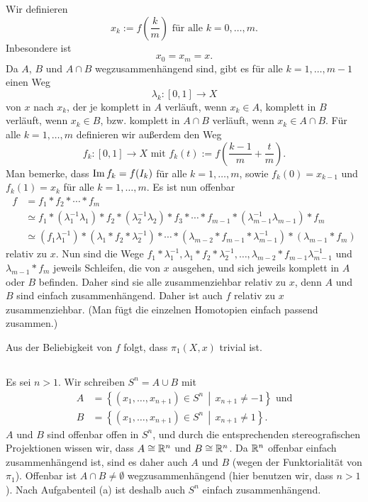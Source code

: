 \documentclass[a4paper,10pt]{article}
\begin{document}
Wir definieren
\[
 x_k := f\left( \frac{k}{m} \right) \text{ für alle } k = 0, \ldots, m.
\]
Inbesondere ist
\[
 x_0 = x_m = x.
\]
Da $A$, $B$ und $A \cap B$ wegzusammenhängend sind, gibt es für alle $k = 1, \ldots, m-1$ einen Weg
\[
 \lambda_k : [0,1] \to X
\]
von $x$ nach $x_k$, der je komplett in $A$ verläuft, wenn $x_k \in A$, komplett in $B$ verläuft, wenn $x_k \in B$, bzw. komplett in $A \cap B$ verläuft, wenn $x_k \in A \cap B$. Für alle $k = 1, \ldots, m$ definieren wir außerdem den Weg
\[
 f_k : [0,1] \to X \text{ mit } f_k(t) := f\left( \frac{k-1}{m} + \frac{t}{m} \right).
\]
Man bemerke, dass  $\operatorname{Im} f_k = f(I_k)$ für alle $k = 1, \ldots, m$, sowie $f_k(0) = x_{k-1}$ und$f_k(1) = x_k$ für alle $k = 1, \ldots, m$.
Es ist nun offenbar
\begin{align*}
 f
 &= f_1 * f_2 * \cdots * f_m \\
 &\simeq f_1 * \left( \lambda_1^{-1} \lambda_1 \right) * f_2 * \left( \lambda_2^{-1} \lambda_2 \right) * f_3 * \cdots * f_{m-1} * \left( \lambda_{m-1}^{-1} \lambda_{m-1} \right) * f_m \\
 &\simeq \left( f_1 \lambda_1^{-1} \right) * \left( \lambda_1 * f_2 * \lambda_2^{-1} \right) * \cdots * \left( \lambda_{m-2} * f_{m-1} * \lambda_{m-1}^{-1} \right) * \left( \lambda_{m-1} * f_m \right)
\end{align*}
relativ zu $x$. Nun sind die Wege  $f_1 * \lambda_1^{-1}, \lambda_1 * f_2 * \lambda_2^{-1}, \ldots, \lambda_{m-2} * f_{m-1} \lambda_{m-1}^{-1}$ und $\lambda_{m-1} * f_m$ jeweils Schleifen, die von $x$ ausgehen, und sich jeweils komplett in $A$ oder $B$ befinden. Daher sind sie alle zusammenziehbar relativ zu $x$, denn $A$ und $B$ sind einfach zusammenhängend. Daher ist auch $f$ relativ zu $x$ zusammenziehbar. (Man fügt die einzelnen Homotopien einfach passend zusammen.)

Aus der Beliebigkeit von $f$ folgt, dass $\pi_1(X,x)$ trivial ist.


\subsection{}
Es sei $n > 1$. Wir schreiben $S^n = A \cup B$ mit
\begin{align*}
 A &= \left\{ (x_1, \ldots, x_{n+1}) \in S^n \,\middle|\, x_{n+1} \neq -1 \right\} \text{ und} \\
 B &= \left\{ (x_1, \ldots, x_{n+1}) \in S^n \,\middle|\, x_{n+1} \neq 1 \right\}.
\end{align*}
$A$ und $B$ sind offenbar offen in $S^n$, und durch die entsprechenden stereografischen Projektionen wissen wir, dass $A \cong \mathbb{R}^n$ und $B \cong \mathbb{R}^n$. Da $\mathbb{R}^n$ offenbar einfach zusammenhängend ist, sind es daher auch $A$ und $B$ (wegen der Funktorialität von $\pi_1$). Offenbar ist $A \cap B \neq \emptyset$ wegzusammenhängend (hier benutzen wir, dass $n > 1$). Nach Aufgabenteil (a) ist deshalb auch $S^n$ einfach zusammenhängend.
\end{document}

